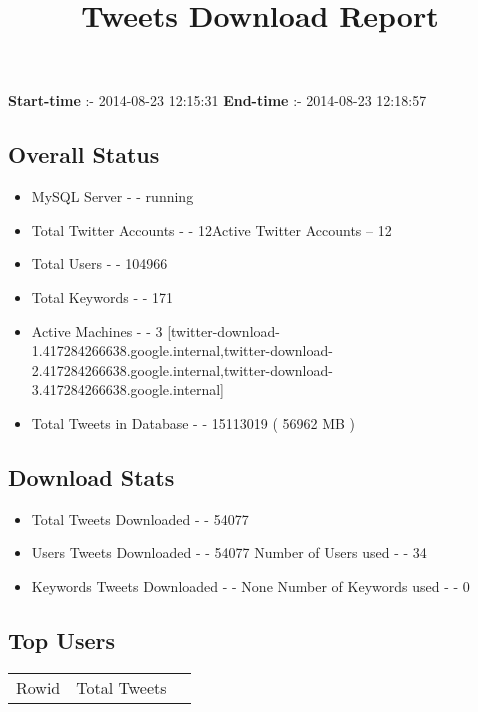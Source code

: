 \documentclass{article}\usepackage[T1]{fontenc}
\begin{document}
\title{\textbf{Tweets Download Report}}
               \date{}
                \maketitle
               \centerline{\textbf{Start-time} :- 2014-08-23 12:15:31 \hspace{40pt} \textbf{End-time} :- 2014-08-23 12:18:57}               \subsection*{Overall Status}                \begin{itemize}                \item MySQL Server - - running               \item Total Twitter Accounts - - 12\newline Active Twitter Accounts -- 12               \item Total Users - - 104966               \item Total Keywords - - 171               \item Active Machines - - 3 [twitter-download-1.417284266638.google.internal,twitter-download-2.417284266638.google.internal,twitter-download-3.417284266638.google.internal]               \item Total Tweets in Database - - 15113019 ( 56962 MB )               \end{itemize}               \subsection*{Download Stats}                \begin{itemize}                \item Total Tweets Downloaded - - 54077               \item Users Tweets Downloaded - - 54077 \newline Number of Users used - - 34               \item Keywords Tweets Downloaded - - None \newline Number of Keywords used - - 0              \end{itemize}              \subsection*{Top Users}\begin{tabular}{|c|c|c|}         \hline         Rowid & Total Tweets \\ 

\end{tabular}
\end{document}

